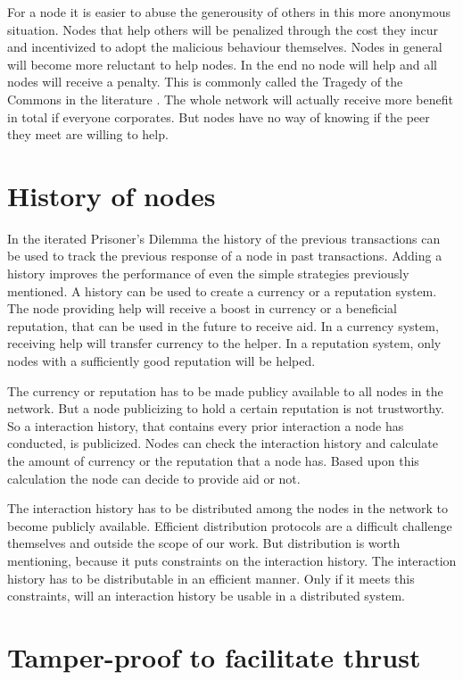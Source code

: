 For a node it is easier to abuse the generousity of others in this more anonymous situation.
Nodes that help others will be penalized through the cost they incur
and incentivized to adopt the malicious behaviour themselves.
Nodes in general will become more reluctant to help nodes\cite{Nowak-PrisonerDilemma}.
In the end no node will help and all nodes will receive a penalty.
This is commonly called the Tragedy of the Commons in the literature \cite{Hardin-Tragedy}.
The whole network will actually receive more benefit in total if everyone corporates.
But nodes have no way of knowing if the peer they meet are willing to help.

\section{History of nodes}

In the iterated Prisoner's Dilemma the history of the previous transactions can be used 
to track the previous response of a node in past transactions.
Adding a history improves the performance of even the simple strategies previously mentioned.
A history can be used to create a currency or a reputation system.
The node providing help will receive a boost in currency or a beneficial reputation, 
that can be used in the future to receive aid.
In a currency system, receiving help will transfer currency to the helper.
In a reputation system, only nodes with a sufficiently good reputation will be helped.

The currency or reputation has to be made publicy available to all nodes in the network.
But a node publicizing to hold a certain reputation is not trustworthy.
So a interaction history, that contains every prior interaction a node has conducted, is publicized.
Nodes can check the interaction history and calculate the amount of currency 
or the reputation that a node has.
Based upon this calculation the node can decide to provide aid or not.

The interaction history has to be distributed among the nodes in the network
to become publicly available.
Efficient distribution protocols are a difficult challenge themselves and outside the scope of our work.
But distribution is worth mentioning, because it puts constraints on the interaction history.
The interaction history has to be distributable in an efficient manner.
Only if it meets this constraints, will an interaction history be usable in a distributed system.

\section{Tamper-proof to facilitate thrust}

